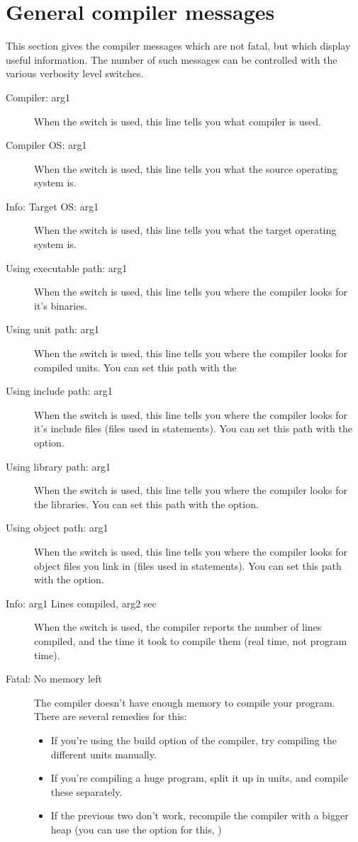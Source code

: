  \section{General compiler messages}
 This section gives the compiler messages which are not fatal, but which
 display useful information. The number of such messages can be
 controlled with the various verbosity level  switches.
 \begin{description}
\item [Compiler: arg1]
 When the  switch is used, this line tells you what compiler
 is used.
\item [Compiler OS: arg1]
 When the  switch is used, this line tells you what the source
 operating system is.
\item [Info: Target OS: arg1]
 When the  switch is used, this line tells you what the target
 operating system is.
\item [Using executable path: arg1]
 When the  switch is used, this line tells you where the compiler
 looks for it's binaries.
\item [Using unit path: arg1]
 When the  switch is used, this line tells you where the compiler
 looks for compiled units. You can set this path with the 
\item [Using include path: arg1]
 When the  switch is used, this line tells you where the compiler
 looks for it's include files (files used in  statements).
 You can set this path with the  option.
\item [Using library path: arg1]
 When the  switch is used, this line tells you where the compiler
 looks for the libraries. You can set this path with the  option.
\item [Using object path: arg1]
 When the  switch is used, this line tells you where the compiler
 looks for object files you link in (files used in  statements).
 You can set this path with the  option.
\item [Info: arg1 Lines compiled, arg2 sec]
 When the  switch is used, the compiler reports the number
 of lines compiled, and the time it took to compile them (real time,
 not program time).
\item [Fatal: No memory left]
 The compiler doesn't have enough memory to compile your program. There are
 several remedies for this:
 \begin{itemize}
 \item If you're using the build option of the compiler, try compiling the
 different units manually.
 \item If you're compiling a huge program, split it up in units, and compile
 these separately.
 \item If the previous two don't work, recompile the compiler with a bigger
 heap (you can use the  option for this, )
 \end{itemize}
 \end{description}
